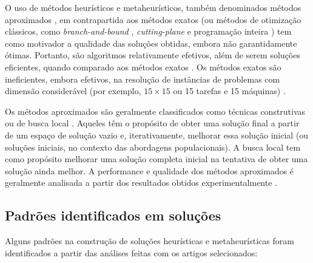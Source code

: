 \documentclass[relatorio,nocolorlinks]{inf-ufg}
\begin{document}
O uso de m\'{e}todos heur\'{i}sticos e metaheur\'{i}sticos, tamb\'{e}m denominados m\'{e}todos aproximados \cite{Rondon2009}, em contrapartida aos
m\'{e}todos exatos (ou m\'{e}todos de otimiza\c{c}\~{a}o cl\'{a}ssicos, como \textit{branch-and-bound} \cite{French1982} \cite{Artigues2009},
\textit{cutting-plane} e programa\c{c}\~{a}o inteira \cite{French1982}) tem como motivador a qualidade das solu\c{c}\~{o}es obtidas, embora n\~{a}o
garantidamente \'{o}timas. Portanto, s\~{a}o algoritmos relativamente efetivos, al\'{e}m de serem solu\c{c}\~{o}es eficientes, quando comparado
aos m\'{e}todos exatos \cite{Chen2011}. Os m\'{e}todos exatos s\~{a}o ineficientes, embora efetivos, na resolu\c{c}\~{a}o de inst\^{a}ncias de
problemas com dimens\~{a}o consider\'{a}vel (por exemplo, $15 \times 15$ ou 15 tarefas e 15 m\'{a}quinas) \cite{Chen2011}.

Os m\'{e}todos aproximados s\~{a}o geralmente classificados como t\'{e}cnicas construtivas ou de busca local \cite{Rondon2009}. Aqueles t\^{e}m o
prop\'{o}sito de obter uma solu\c{c}\~{a}o final a partir de um espa\c{c}o de solu\c{c}\~{a}o vazio e, iterativamente, melhorar essa
solu\c{c}\~{a}o inicial (ou solu\c{c}\~{o}es iniciais, no contexto das abordagens populacionais). A busca local tem como prop\'{o}sito melhorar
uma solu\c{c}\~{a}o completa inicial na tentativa de obter uma solu\c{c}\~{a}o ainda melhor. A performance e qualidade dos m\'{e}todos
aproximados \'{e} geralmente analisada a partir dos resultados obtidos experimentalmente \cite{DeJong2006} \cite{Rondon2009}.

\subsection{Padr\~{o}es identificados em solu\c{c}\~{o}es}

Alguns padr\~{o}es na constru\c{c}\~{a}o de solu\c{c}\~{o}es heur\'{i}sticas e metaheur\'{i}sticas foram identificados a partir das an\'{a}lises
feitas com os artigos selecionados:
\end{document}

